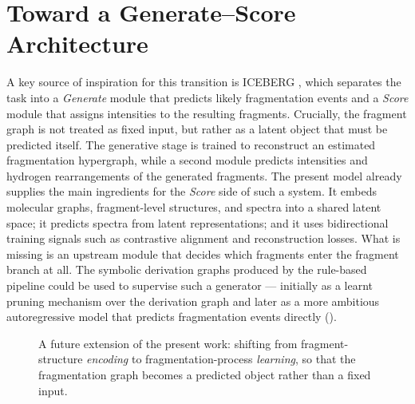 \section{Toward a Generate--Score Architecture}
A key source of inspiration for this transition is ICEBERG \cite{Goldman2024}, which separates the task into a \emph{Generate} module that predicts likely fragmentation events and a \emph{Score} module that assigns intensities to the resulting fragments.
Crucially, the fragment graph is not treated as fixed input, but rather as a latent object that must be predicted itself.
The generative stage is trained to reconstruct an estimated fragmentation hypergraph, while a second module predicts intensities and hydrogen rearrangements of the generated fragments.
The present model already supplies the main ingredients for the \emph{Score} side of such a system.
It embeds molecular graphs, fragment-level structures, and spectra into a shared latent space; it predicts spectra from latent representations; and it uses bidirectional training signals such as contrastive alignment and reconstruction losses.
What is missing is an upstream module that decides which fragments enter the fragment branch at all.
The symbolic derivation graphs produced by the rule-based pipeline could be used to supervise such a generator — initially as a learnt pruning mechanism over the derivation graph and later as a more ambitious autoregressive model that predicts fragmentation events directly ().


\begin{figure}[htbp]
    \centering
    \resizebox{0.9\textwidth}{!}{%
    }
    \caption[Future extension toward a Generate -- Score architecture]{
        A future extension of the present work: shifting from fragment-structure \emph{encoding} to fragmentation-process \emph{learning},
        so that the fragmentation graph becomes a predicted object rather than a fixed input.
    }
    \label{fig:generative-future}
\end{figure}


